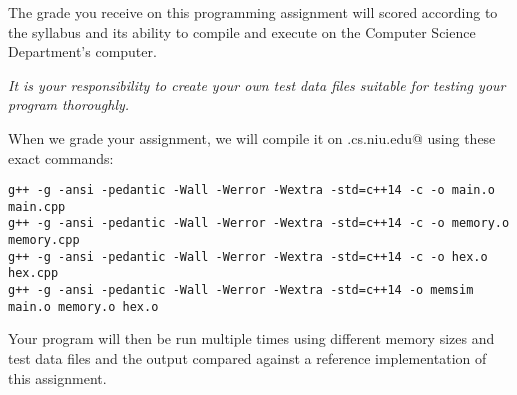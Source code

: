 \documentclass[11pt]{article}
\begin{document}
The grade you receive on this programming assignment will scored according to the
syllabus and its ability to compile and execute on the Computer Science Department's 
computer.

{\em It is your responsibility to create your own test data files suitable for 
testing your program thoroughly.} 

When we grade your assignment, we will compile it on \verb@hopper.cs.niu.edu@ 
using these exact commands:

\begin{minipage}{\textwidth}
\begin{lstlisting}[frame=single, title={Compiling Your Assignment}]
g++ -g -ansi -pedantic -Wall -Werror -Wextra -std=c++14 -c -o main.o main.cpp
g++ -g -ansi -pedantic -Wall -Werror -Wextra -std=c++14 -c -o memory.o memory.cpp
g++ -g -ansi -pedantic -Wall -Werror -Wextra -std=c++14 -c -o hex.o hex.cpp
g++ -g -ansi -pedantic -Wall -Werror -Wextra -std=c++14 -o memsim main.o memory.o hex.o 
\end{lstlisting}
\end{minipage}

Your program will then be run multiple times using different memory sizes and
test data files and the output compared against a reference implementation of this
assignment.
\end{document}
